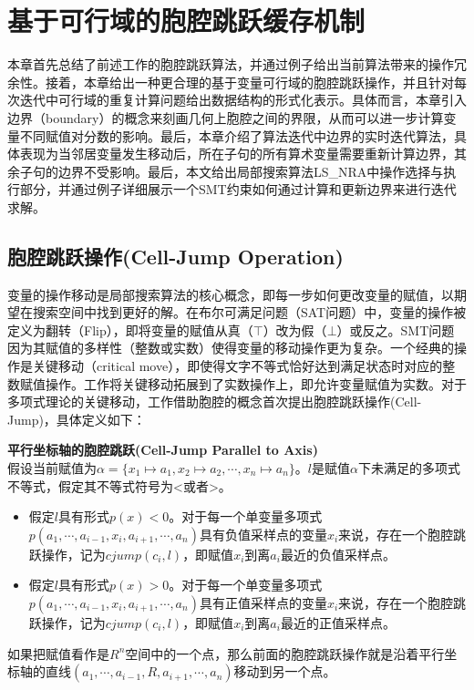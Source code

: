 \chapter{基于可行域的胞腔跳跃缓存机制}\label{chap:method1}
本章首先总结了前述工作的胞腔跳跃算法，并通过例子给出当前算法带来的操作冗余性。接着，本章给出一种更合理的基于变量可行域的胞腔跳跃操作，并且针对每次迭代中可行域的重复计算问题给出数据结构的形式化表示。具体而言，本章引入边界（boundary）的概念来刻画几何上胞腔之间的界限，从而可以进一步计算变量不同赋值对分数的影响。最后，本章介绍了算法迭代中边界的实时迭代算法，具体表现为当邻居变量发生移动后，所在子句的所有算术变量需要重新计算边界，其余子句的边界不受影响。最后，本文给出局部搜索算法LS\_NRA中操作选择与执行部分，并通过例子详细展示一个SMT约束如何通过计算和更新边界来进行迭代求解。

\section{胞腔跳跃操作(Cell-Jump Operation)}
变量的操作移动是局部搜索算法的核心概念，即每一步如何更改变量的赋值，以期望在搜索空间中找到更好的解。在布尔可满足问题（SAT问题）中，变量的操作被定义为翻转（Flip），即将变量的赋值从真（$\top$）改为假（$\bot$）或反之。SMT问题因为其赋值的多样性（整数或实数）使得变量的移动操作更为复杂。一个经典的操作是关键移动（critical move）\cite{CaiLZ22}，即使得文字不等式恰好达到满足状态时对应的整数赋值操作。工作\cite{multilinear}将关键移动拓展到了实数操作上，即允许变量赋值为实数。对于多项式理论的关键移动，工作\cite{LiXZ23}借助胞腔的概念首次提出胞腔跳跃操作(Cell-Jump)，具体定义如下：

\begin{definition}{\textbf{平行坐标轴的胞腔跳跃(Cell-Jump Parallel to Axis)}}\\
假设当前赋值为$\alpha = \{x_1 \mapsto a_1, x_2 \mapsto a_2, \cdots, x_n \mapsto a_n\}$。$l$是赋值$\alpha$下未满足的多项式不等式，假定其不等式符号为<或者>。
\begin{itemize}
    \item 假定$l$具有形式$p(x) < 0$。对于每一个单变量多项式$p(a_1, \cdots, a_{i-1}, x_i, a_{i+1}, \cdots, a_n)$具有负值采样点的变量$x_i$来说，存在一个胞腔跳跃操作，记为$cjump(c_i, l)$，即赋值$x_i$到离$a_i$最近的负值采样点。
    \item 假定$l$具有形式$p(x) > 0$。对于每一个单变量多项式$p(a_1, \cdots, a_{i-1}, x_i, a_{i+1}, \cdots, a_n)$具有正值采样点的变量$x_i$来说，存在一个胞腔跳跃操作，记为$cjump(c_i, l)$，即赋值$x_i$到离$a_i$最近的正值采样点。
\end{itemize}
如果把赋值看作是$R^n$空间中的一个点，那么前面的胞腔跳跃操作就是沿着平行坐标轴的直线$(a_1, \cdots, a_{i-1}, R, a_{i+1}, \cdots, a_n)$移动到另一个点。
\end{definition}

